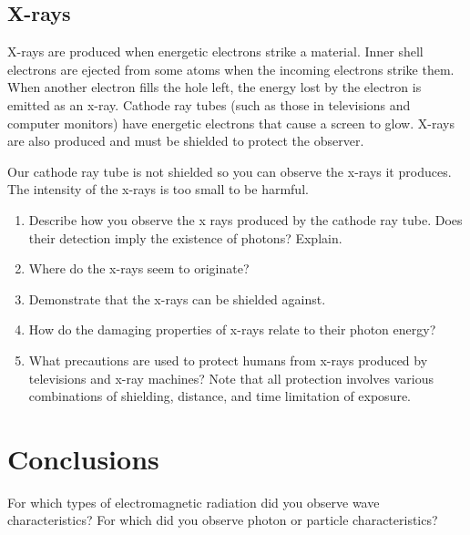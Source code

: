 \subsection {X-rays}
X-rays are produced when energetic electrons strike a material.  Inner shell electrons are ejected from some atoms when the incoming electrons strike them.  When another electron fills the hole left, the energy lost by the electron is emitted as an x-ray.  Cathode ray tubes (such as those in televisions and computer monitors) have energetic electrons that cause a screen to glow.  X-rays are also produced and must be shielded to protect the observer.  

Our cathode ray tube is not shielded so you can observe the x-rays it produces.  The intensity of the x-rays is too small to be harmful.
\begin{enumerate}
	\item Describe how you observe the x rays produced by the cathode ray tube.  Does their detection imply the existence of photons?  Explain.
	\item Where do the x-rays seem to originate?
	\item Demonstrate that the x-rays can be shielded against.
	\item How do the damaging properties of x-rays relate to their photon energy?
	\item What precautions are used to protect humans from x-rays produced by televisions and x-ray machines?  Note that all protection involves various combinations of shielding, distance, and time limitation of exposure.
\end{enumerate}

\section{Conclusions}
  For which types of electromagnetic radiation did you observe wave characteristics?  For which did you observe photon or particle characteristics?


  
